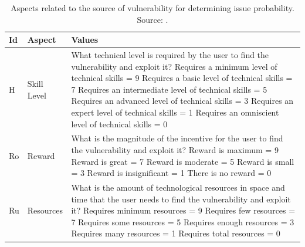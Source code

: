 \documentclass[preprint,10pt]{elsarticle}
\begin{document}
\begin{table}[h!]
    \caption{Aspects related to the source of vulnerability for determining issue probability. Source: .}
    \label{tab:6}
    \centering
    \begin{tabular}{llp{7cm}}
        \toprule
        \textbf{Id} & \textbf{Aspect} & \textbf{Values} \\
        \midrule
        H & Skill Level & What technical level is required by the user to find the vulnerability and exploit it? \newline Requires a minimum level of technical skills = 9 \newline Requires a basic level of technical skills = 7 \newline Requires an intermediate level of technical skills = 5 \newline Requires an advanced level of technical skills = 3 \newline Requires an expert level of technical skills = 1 \newline Requires an omniscient level of technical skills = 0 \\
        \addlinespace
        Ro & Reward & What is the magnitude of the incentive for the user to find the vulnerability and exploit it? \newline Reward is maximum = 9 \newline Reward is great = 7 \newline Reward is moderate = 5 \newline Reward is small = 3 \newline Reward is insignificant = 1 \newline There is no reward = 0 \\
        \addlinespace
        Ru & Resources & What is the amount of technological resources in space and time that the user needs to find the vulnerability and exploit it? \newline Requires minimum resources = 9 \newline Requires few resources = 7 \newline Requires some resources = 5 \newline Requires enough resources = 3 \newline Requires many resources = 1 \newline Requires total resources = 0 \\
        \bottomrule
    \end{tabular}
\end{table}
\end{document}
